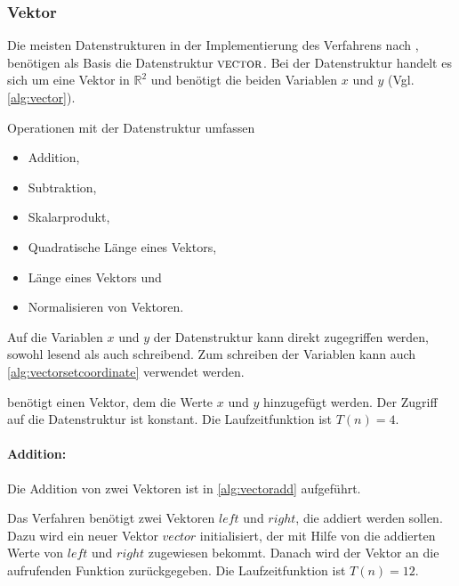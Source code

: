 \subsubsection{Vektor} %
\label{sub:vektor}

Die meisten Datenstrukturen in der Implementierung des Verfahrens nach \citeauthor{hirzer08}, benötigen als Basis die
 Datenstruktur $\textproc{vector}$. Bei der Datenstruktur handelt es sich um eine Vektor in $\mathbb{R}^2$ und benötigt
 die beiden Variablen $x$ und $y$ (Vgl. \autoref{alg:vector}).

Operationen mit der Datenstruktur  umfassen

\begin{itemize}
	\item Addition,
	\item Subtraktion,
	\item Skalarprodukt,
	\item Quadratische Länge eines Vektors,
	\item Länge eines Vektors und
	\item Normalisieren von Vektoren.
\end{itemize}

Auf die Variablen $x$ und $y$ der Datenstruktur kann direkt zugegriffen werden, sowohl lesend als auch schreibend. Zum
 schreiben der Variablen kann auch \autoref{alg:vectorsetcoordinate} verwendet werden.

 benötigt einen Vektor, dem die Werte $x$ und $y$ hinzugefügt werden. Der Zugriff auf die
 Datenstruktur  ist konstant. Die Laufzeitfunktion ist $T(n) = 4$.

\paragraph{Addition:} %
\label{par:addition}

Die Addition von zwei Vektoren ist in \autoref{alg:vectoradd} aufgeführt.

Das Verfahren benötigt zwei Vektoren $\mathit{left}$ und $\mathit{right}$, die addiert werden sollen. Dazu wird ein
 neuer Vektor $\mathit{vector}$ initialisiert, der mit Hilfe von  die addierten Werte von
 $\mathit{left}$ und $\mathit{right}$ zugewiesen bekommt. Danach wird der Vektor an die aufrufenden Funktion
 zurückgegeben. Die Laufzeitfunktion ist $T(n) = 12$.


